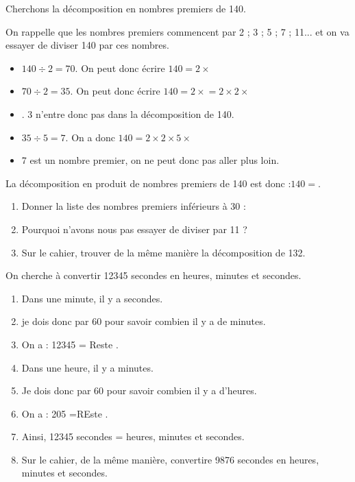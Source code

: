 
Cherchons la décomposition en nombres premiers de 140.


On rappelle que les nombres premiers commencent par 2 ; 3 ; 5 ; 7 ; 11... et on va essayer de diviser 140 par ces nombres.
\begin{itemize}
	\item $140\div2=70$. On peut donc écrire $140=2 \times$\fillin
	\item $70\div2=35$. On peut donc écrire $140=2 \times$\fillin[1cm]$=2 \times2 \times$\fillin[1cm]
	\item {}. 3 n'entre donc pas dans la décomposition de 140.
	\item $35\div5=7$. On a donc $140=2 \times2 \times 5 \times$\fillin[1cm]
	\item 7 est un nombre premier, on ne peut donc pas aller plus loin.
\end{itemize}
La décomposition en produit de nombres premiers de 140 est donc :$140=$\dotfill.

\begin{enumerate}
	\item Donner la liste des nombres premiers inférieurs à 30 :
	\item Pourquoi n'avons nous pas essayer de diviser par 11 ?
	\item Sur le cahier, trouver de la même manière la décomposition de 132.
\end{enumerate}



On cherche à convertir 12345 secondes en heures, minutes et secondes.

\begin{enumerate}
	\item Dans une minute, il y a \fillin secondes.
	\item je dois donc  par 60 pour savoir combien il y a de minutes.
	\item On a : 12345  = \fillin[1cm] Reste \fillin[1cm].
	\item Dans une heure, il y a \fillin minutes.
	\item Je dois donc  par 60 pour savoir combien il y a d'heures.
	\item On a : 205  =\fillin[1cm] REste \fillin[1cm].
	\item Ainsi, 12345 secondes = \fillin[1cm] heures, \fillin[1cm] minutes et \fillin[1cm] secondes.
	\item Sur le cahier, de la même manière, convertire 9876 secondes en heures, minutes et secondes.
\end{enumerate}

